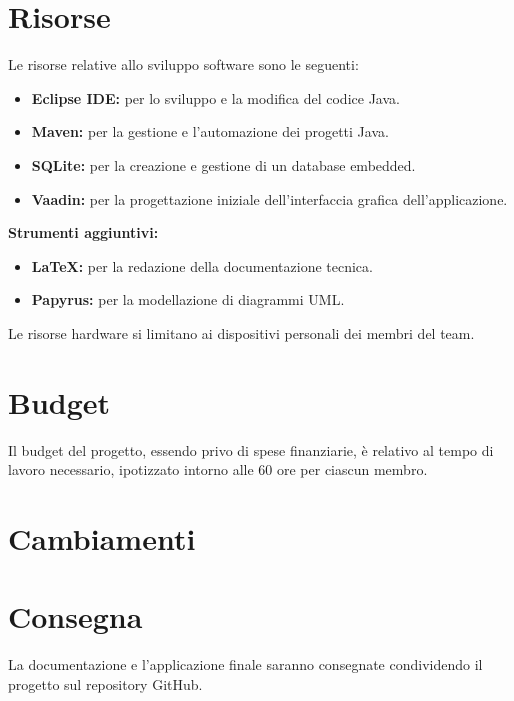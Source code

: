 \documentclass[a4paper,12pt]{article}
\begin{document}
\section{Risorse} %
Le risorse relative allo sviluppo software sono le seguenti:
\begin{itemize}
    \item \textbf{Eclipse IDE:} per lo sviluppo e la modifica del codice Java.
    \item \textbf{Maven:} per la gestione e l’automazione dei progetti Java.
    \item \textbf{SQLite:} per la creazione e gestione di un database embedded.
    \item \textbf{Vaadin:} per la progettazione iniziale dell’interfaccia grafica dell’applicazione.
\end{itemize}

\textbf{Strumenti aggiuntivi:}
\begin{itemize}
    \item \textbf{LaTeX:} per la redazione della documentazione tecnica.
    \item \textbf{Papyrus:} per la modellazione di diagrammi UML.
\end{itemize}

Le risorse hardware si limitano ai dispositivi personali dei membri del team.

\section{Budget} %
Il budget del progetto, essendo privo di spese finanziarie, è relativo al tempo di lavoro necessario, ipotizzato intorno alle 60 ore per ciascun membro. 

\section{Cambiamenti} %

\section{Consegna} %
La documentazione e l'applicazione finale saranno consegnate condividendo il progetto sul repository GitHub.
\end{document}
